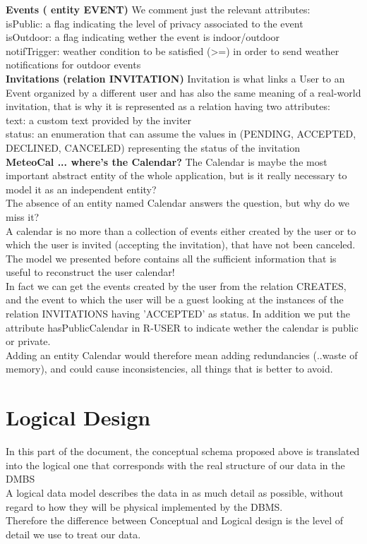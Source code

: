 \documentclass[12pt]{book}
\begin{document}
\textbf{Events ( entity EVENT)}
We comment just the relevant attributes: \\
isPublic: a flag indicating the level of privacy associated to the event\\
isOutdoor: a flag indicating wether the event is indoor/outdoor\\
notifTrigger: weather condition to be satisfied (>=) in order to send weather notifications for outdoor events\\


\textbf{Invitations (relation INVITATION)}
Invitation is what links a User to an Event organized by a different user and has also the same meaning of a real-world invitation, that is why it is represented as a relation having two attributes: \\
text: a custom text provided by the inviter\\
status: an enumeration that can assume the values in (PENDING, ACCEPTED, DECLINED, CANCELED) representing the status of the invitation\\

\textbf{MeteoCal ... where's the Calendar?}
The Calendar is maybe the most important abstract entity of the whole application, but is it really necessary to model it as an independent entity?\\
The absence of an entity named Calendar answers the question, but why do we miss it?\\
A calendar is no more than a collection of events either created by the user or to which the user is invited (accepting the invitation), that have not been canceled.\\
The model we presented before contains all the sufficient information that is useful to reconstruct the user calendar! \\
In fact we can get the events created by the user from the relation CREATES, and the event to which the user will be a guest looking at the instances of the relation INVITATIONS having 'ACCEPTED' as status.
In addition we put the attribute  hasPublicCalendar  in R-USER to indicate wether the calendar is public or private.\\
Adding an entity Calendar would therefore mean adding redundancies (..waste of memory), and could cause inconsistencies, all things that is better to avoid.\\
\newpage

\section{Logical Design}
In this part of the document, the conceptual schema proposed above is translated into the logical one that corresponds with the real structure of our data in the DMBS\\
A logical data model describes the data in as much detail as possible, without regard to how they will be physical implemented by the DBMS.\\
Therefore the difference between Conceptual and Logical design is the level of detail we use to treat our data.\\
\end{document}
